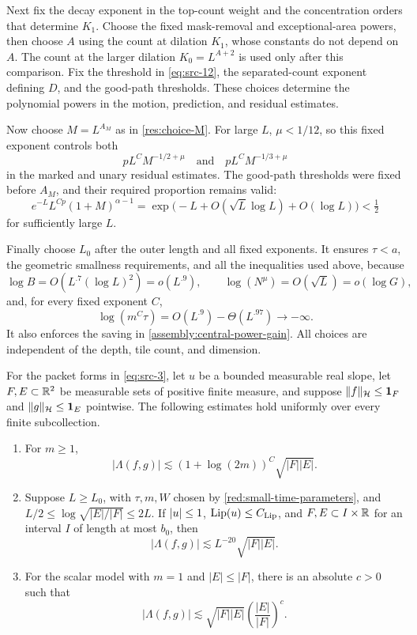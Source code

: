 Next fix the decay exponent in the top-count weight and the concentration
orders that determine \(K_1\).  Choose the fixed mask-removal and
exceptional-area powers, then choose \(A\) using the count at dilation
\(K_1\), whose constants do not depend on \(A\).  The count at the larger
dilation \(K_0=L^{A+2}\) is used only after this comparison.  Fix the threshold
in \eqref{eq:src-12}, the separated-count exponent defining \(D\), and
the good-path thresholds.  These choices determine the polynomial powers
in the motion, prediction, and residual estimates.

Now choose \(M=L^{A_M}\) as in \eqref{res:choice-M}.  For large \(L\),
\(\mu<1/12\), so this fixed exponent controls both
\[
 pL^C M^{-1/2+\mu}
 \quad\text{and}\quad
 pL^C M^{-1/3+\mu}
\]
in the marked and unary residual estimates.  The good-path thresholds
were fixed before \(A_M\), and their required proportion remains valid:
\[
 e^{-L}L^{Cp}(1+M)^{\alpha-1}
       =\exp\big(-L+O(\sqrt L\log L)+O(\log L)\big)<\tfrac12
\]
for sufficiently large \(L\).

Finally choose \(L_0\) after the outer length and all fixed exponents.
It ensures \(\tau<a\), the geometric smallness requirements, and all
the inequalities used above, because
\[
 \log B=O(L^{.7}(\log L)^2)=o(L^{.9}),\qquad
 \log(N^\mu)=O(\sqrt L)=o(\log G),
\]
and, for every fixed exponent \(C\),
\[
 \log(m^C\tau)=O(L^{.9})-\Theta(L^{.97})\longrightarrow-\infty.
\]
It also enforces the saving in \eqref{assembly:central-power-gain}.
All choices are independent of the depth, tile count, and dimension.

\begin{theorem}
\label{assembly:all-model-estimates}
For the packet forms in \eqref{eq:src-3}, let \(u\) be a bounded
measurable real slope, let \(F,E\subset\mathbb R^2\) be measurable sets of
positive finite measure, and suppose
\(\|f\|_{\mathcal H}\le\mathbf 1_F\) and
\(\|g\|_{\mathcal H}\le\mathbf 1_E\) pointwise.  The following estimates
hold uniformly over every finite subcollection.
\begin{enumerate}[label=\textup{(\roman*)}]
\item For \(m\ge1\),
\[
 |\Lambda(f,g)|\lesssim(1+\log(2m))^C\sqrt{|F||E|}.
\]
\item Suppose \(L\ge L_0\), with \(\tau,m,W\) chosen by
\eqref{red:small-time-parameters}, and
\(L/2\le\log\sqrt{|E|/|F|}\le2L\).  If
\(\left|u\right|\le1\), \(\operatorname{Lip}(u)\le C_{\rm Lip}\), and
\(F,E\subset I\times\mathbb R\) for an interval \(I\) of length at most
\(b_0\), then
\[
 |\Lambda(f,g)|\lesssim L^{-20}\sqrt{|F||E|}.
\]
\item For the scalar model with \(m=1\) and \(|E|\le|F|\), there is an absolute
\(c>0\) such that
\[
 |\Lambda(f,g)|\lesssim
       \sqrt{|F||E|}\left(\frac{|E|}{|F|}\right)^c.
\]
\end{enumerate}
\end{theorem}

